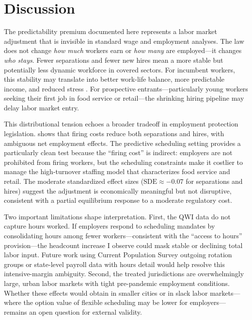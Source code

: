 \documentclass[12pt]{article}
\begin{document}
\section{Discussion}

The predictability premium documented here represents a labor market adjustment that is invisible in standard wage and employment analyses. The law does not change \emph{how much} workers earn or \emph{how many} are employed---it changes \emph{who stays}. Fewer separations and fewer new hires mean a more stable but potentially less dynamic workforce in covered sectors. For incumbent workers, this stability may translate into better work-life balance, more predictable income, and reduced stress \citep{schneider2019consequences, harknett2021improving}. For prospective entrants---particularly young workers seeking their first job in food service or retail---the shrinking hiring pipeline may delay labor market entry.

This distributional tension echoes a broader tradeoff in employment protection legislation. \citet{lazear1990job} shows that firing costs reduce both separations and hires, with ambiguous net employment effects. The predictive scheduling setting provides a particularly clean test because the ``firing cost'' is indirect: employers are not prohibited from firing workers, but the scheduling constraints make it costlier to manage the high-turnover staffing model that characterizes food service and retail. The moderate standardized effect sizes ($\text{SDE} \approx -0.07$ for separations and hires) suggest the adjustment is economically meaningful but not disruptive, consistent with a partial equilibrium response to a moderate regulatory cost.

Two important limitations shape interpretation. First, the QWI data do not capture hours worked. If employers respond to scheduling mandates by consolidating hours among fewer workers---consistent with the ``access to hours'' provision---the headcount increase I observe could mask stable or declining total labor input. Future work using Current Population Survey outgoing rotation groups or state-level payroll data with hours detail would help resolve this intensive-margin ambiguity. Second, the treated jurisdictions are overwhelmingly large, urban labor markets with tight pre-pandemic employment conditions. Whether these effects would obtain in smaller cities or in slack labor markets---where the option value of flexible scheduling may be lower for employers---remains an open question for external validity.
\end{document}
